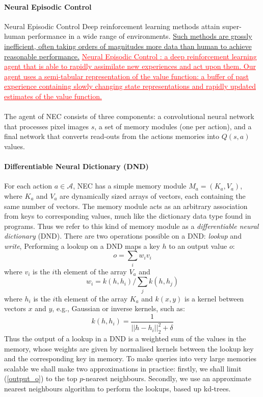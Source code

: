 \paragraph{Neural Episodic Control} Neural Episodic Control \cite{pritzel2017neural}
Deep reinforcement learning methods attain super-human performance in a wide range of environments. \uline{Such methods are grossly inefficient,  often taking orders of magnitudes more data than human to achieve reasonable performance.} \textcolor{red}{\uline{Neural Episodic Control : a deep reinforcement learning agent that is able to rapidly assimilate new experiences and act upon them. Our agent uses a semi-tabular representation of the value function: a buffer of past experience containing slowly changing state representations and rapidly updated estimates of the value function. }}
\paragraph{} The agent of NEC consists of three components: a convolutional neural network that processes pixel images $s$, a set of memory modules (one per action), and a final network that converts read-outs from the actions memories into $Q(s, a)$ values.
\paragraph{Differentiable Neural Dictionary (DND)} For each action $a \in \mathcal{A}$, NEC has a simple memory module $M_{a} = (K_{a}, V_{a})$, where $K_{a}$ and $V_{a}$ are dynamically sized arrays of vectors, each containing the same number of vectors. The memory module acts as an arbitrary association from keys to corresponding values, much like the dictionary data type found in programs. Thus we refer to this kind of memory module as a \textit{differentiable neural dictionary} (DND). There are two operations possible on a DND: \textit{lookup} and \textit{write}, Performing a lookup on a DND maps a key $h$ to an output value $o$:
\begin{equation} \label{output_o}
o = \sum_{i}w_{i}v_{i}
\end{equation}
where $v_{i}$ is the $i$th element of the array $V_{a}$ and 
\begin{equation} \label{weight_w}
w_{i} = k(h, h_{i})/\sum_{j}k(h, h_{j})
\end{equation}
where $h_{i}$ is the $i$th element of the array $K_{a}$ and $k(x, y)$ is a kernel between vectors $x$ and $y$, e.g., Gaussian or inverse kernels, such as:
\begin{equation}
k(h, h_{i}) = \frac{1}{||h - h_{i}||_{2}^{2} + \delta}
\end{equation}
Thus the output of a lookup in a DND is a weighted sum of the values in the memory, whose weights are given by normalised kernels between the lookup key and the corresponding key in memory. To make queries into very large memories scalable we shall make two approximations in practice: firstly, we shall limit (\ref{output_o}) to the top $p$-nearest neighbours. Secondly, we use an approximate nearest neighbours algorithm to perform the lookups, based up kd-trees.

